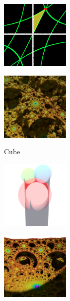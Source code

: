 \documentclass[suppldata, dvipdfmx]{interact}
\theoremstyle{plain}%
\theoremstyle{definition}
\theoremstyle{remark}
\theoremstyle{problemstyle}
\begin{document}
\begin{figure}[H]
 \begin{minipage}[t]{0.23\textwidth}
  \centering
  \includegraphics[width=1.3in, keepaspectratio]{./img/visualization/paramSpace.png}
  \caption{}
  \label{fig:paramSpace}
 \end{minipage}
 \hspace*{\fill}
 \begin{minipage}[t]{0.23\textwidth}
  \centering
  \includegraphics[width=1.3in, keepaspectratio]{./img/visualization/cubeArms.png}
 \caption{Cube}
 \label{fig:cubeArms}
 \end{minipage}
 \hspace*{\fill}
 \begin{minipage}[t]{0.23\textwidth}
  \centering
  \includegraphics[width=1.3in,
  keepaspectratio]{./img/visualization/lowerHalfSphairahedron.png}
 \caption{}
 \label{fig:lowerPrism}
 \end{minipage}
 \hspace*{\fill}
 \begin{minipage}[t]{0.23\textwidth}
  \centering
  \includegraphics[width=1.3in,
  keepaspectratio]{./img/visualization/lowerHalfLimit.png}
 \caption{}
 \label{fig:lowerLimit}
 \end{minipage}
 \hspace*{\fill}
\end{figure}
\end{document}
